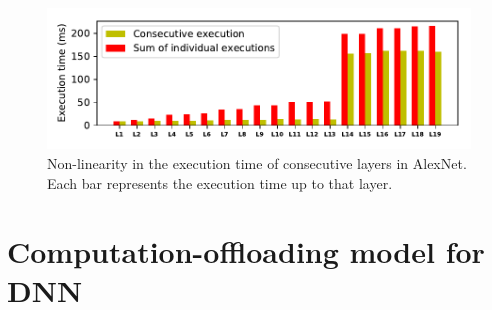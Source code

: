\documentclass[conference,9pt]{IEEEtran}
\begin{document}
\begin{figure}[htbp]
\centerline{\includegraphics[width=\columnwidth]{consec_effect.pdf}}
\caption{Non-linearity in the execution time of consecutive layers in AlexNet\cite{b1}. Each bar represents the execution time up to that layer.}
\label{consecutive_effect}
\end{figure}
\section{Computation-offloading model for DNN}\label{model}


\end{document}
